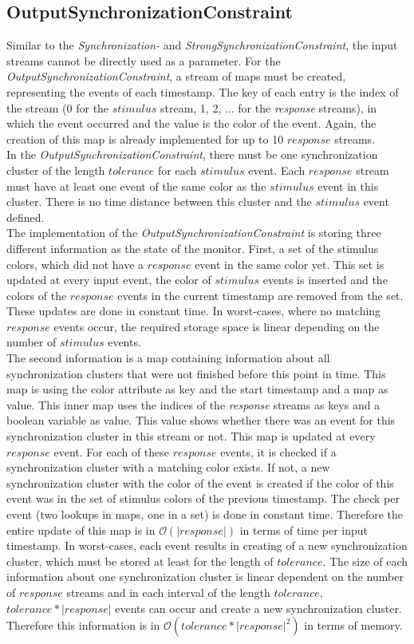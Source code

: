 \subsection{OutputSynchronizationConstraint}
	Similar to the \emph{Synchronization-} and \emph{StrongSynchronizationConstraint}, the input streams cannot be directly used as a parameter. For the \emph{OutputSynchronizationConstraint}, a stream of maps must be created, representing the events of each timestamp. The key of each entry is the index of the stream (0 for the $stimulus$ stream, 1, 2, ... for the \textit{response} streams), in which the event occurred and the value is the color of the event. Again, the creation of this map is already implemented for up to 10 $response$ streams.\\
	In the \emph{OutputSynchronizationConstraint}, there must be one synchronization cluster of the length $tolerance$ for each $stimulus$ event. Each $response$ stream must have at least one event of the same color as the $stimulus$ event in this cluster. There is no time distance between this cluster and the $stimulus$ event defined.\\
	The implementation of the \emph{OutputSynchronizationConstraint} is storing three different information as the state of the monitor. First, a set of the stimulus colors, which did not have a $response$ event in the same color yet. This set is updated at every input event, the color of $stimulus$ events is inserted and the colors of the $response$ events in the current timestamp are removed from the set. These updates are done in constant time. In worst-cases, where no matching $response$ events occur, the required storage space is linear depending on the number of $stimulus$ events.\\
	The second information is a map containing information about all synchronization clusters that were not finished before this point in time. This map is using the color attribute as key and the start timestamp and a map as value. This inner map uses the indices of the \textit{response} streams as keys and a boolean variable as value. This value shows whether there was an event for this synchronization cluster in this stream or not. This map is updated at every $response$ event. For each of these $response$ events, it is checked if a synchronization cluster with a matching color exists. If not, a new synchronization cluster with the color of the event is created if the color of this event was in the set of stimulus colors of the previous timestamp. The check per event (two lookups in maps, one in a set) is done in constant time. Therefore the entire update of this map is in $\mathcal{O}(|response|)$ in terms of time per input timestamp. In worst-cases, each event results in creating of a new synchronization cluster, which must be stored at least for the length of $tolerance$. The size of each information about one synchronization cluster is linear dependent on the number of $response$ streams and in each interval of the length $tolerance$, $tolerance*|response|$ events can occur and create a new synchronization cluster. Therefore this information is in $\mathcal{O}(tolerance*|response|^2)$ in terms of memory.\\
